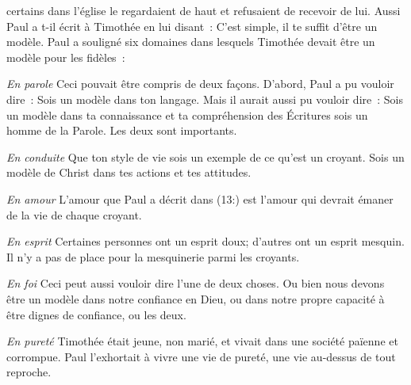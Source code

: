  certains dans l'église
 le regardaient de haut et refusaient de recevoir de lui.
 Aussi Paul a t-il écrit à Timothée en lui disant~: 
 \og C'est simple, il te suffit d'être un modèle. \fg{}
 Paul a souligné six domaines dans lesquels Timothée
 devait être un modèle pour les fidèles~:


\emph{En parole} \ocadr
 Ceci pouvait être compris de deux façons.
 D'abord, Paul a pu vouloir dire~: 
 \og Sois un modèle dans ton langage. \fg{}
 Mais il aurait aussi pu vouloir dire~: 
 \og Sois un modèle dans ta connaissance et ta compréhension des Écritures
 \ocadr sois un homme de la Parole. \fg{} Les deux sont importants.

\emph{En conduite} \ocadr
 Que ton style de vie sois un exemple de ce qu'est un croyant.
 Sois un modèle de Christ dans tes actions et tes attitudes.

\emph{En amour} \ocadr
 L'amour que Paul a décrit dans (13:) 
 est l'amour qui devrait émaner de la vie de chaque croyant.

\emph{En esprit} \ocadr
 Certaines personnes ont un esprit doux; d'autres ont un esprit mesquin.
 Il n'y a pas de place pour la mesquinerie parmi les croyants.

\emph{En foi} \ocadr
 Ceci peut aussi vouloir dire l'une de deux choses.
 Ou bien nous devons être un modèle dans notre confiance en Dieu,
 ou dans notre propre capacité à être dignes de confiance, ou les deux.

\emph{En pureté} \ocadr
 Timothée était jeune, non marié, et vivait dans une société païenne
 et corrompue. Paul l'exhortait à vivre une vie de pureté,
 une vie au-dessus de tout reproche.


\dvrule






